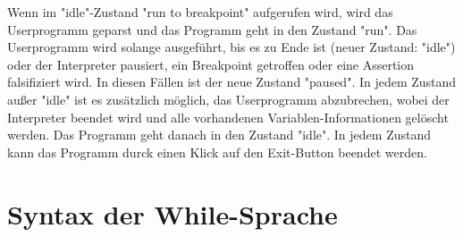 \documentclass[10pt,a4paper,titlepage]{article}
\begin{document}
Wenn im "idle"-Zustand "run to breakpoint" aufgerufen wird, wird das Userprogramm geparst und das Programm geht in den Zustand "run". Das Userprogramm wird solange ausgeführt, bis es zu Ende ist (neuer Zustand: "idle") oder der Interpreter pausiert, ein Breakpoint getroffen oder eine Assertion falsifiziert wird. In diesen Fällen ist der neue Zustand "paused".\newline
In jedem Zustand außer "idle" ist es zusätzlich möglich, das Userprogramm abzubrechen, wobei der Interpreter beendet wird und alle vorhandenen Variablen-Informationen gelöscht werden. Das Programm geht danach in den Zustand "idle".\newline
In jedem Zustand kann das Programm durck einen Klick auf den Exit-Button beendet werden.
\newpage

\section{Syntax der While-Sprache}
\end{document}
